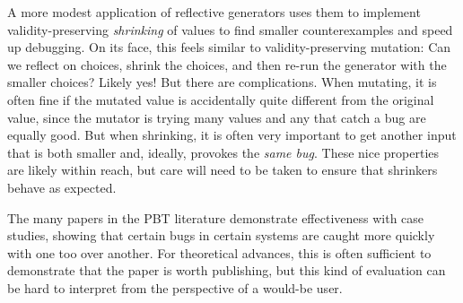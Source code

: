 \label{sec:shrinking}
A more modest application of reflective generators uses them to implement
validity-preserving {\em shrinking} of values to find smaller counterexamples
and speed up debugging. On its face, this feels similar to validity-preserving
mutation: Can we reflect on choices, shrink the choices, and then re-run the
generator with the smaller choices? Likely yes! But there are complications.
When mutating, it is often fine if the mutated value is accidentally quite
different from the original value, since the mutator is trying many values and
any that catch a bug are equally good. But when shrinking, it is often very
important to get another input that is both smaller and, ideally, provokes the
{\em same bug}. These nice properties are likely within reach, but care will
need to be taken to ensure that shrinkers behave as expected.


The many papers in the PBT literature demonstrate effectiveness with case
studies, showing that certain bugs in certain systems are caught more quickly
with one too over another. For theoretical advances, this is often sufficient
to demonstrate that the paper is worth publishing, but this kind of evaluation
can be hard to interpret from the perspective of a would-be user. 

